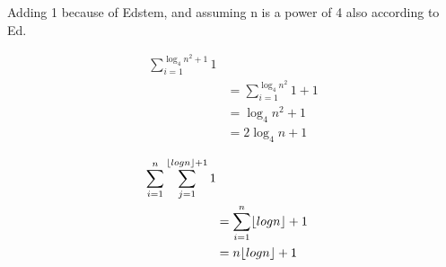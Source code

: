 \documentclass[11pt,largemargins]{homework}
\begin{document}
\begin{alphaparts}
  \newpage
  \questionpart

  Adding 1 because of Edstem, and assuming n is a power of 4 also according to Ed.


  
  \begin{align}
    \sum_{i=1}^{\log_4 n^2 + 1} 1 \\
    &= \sum_{i=1}^{\log_4 n^2} 1 + 1 \\
    &= \log_4 n^2 + 1 \\
    &= 2 \log_4 n + 1
  \end{align}

  \questionpart

  \begin{align}
    \sum_{i=1}^{n} \sum_{j=1}^{\floor*{log n} + 1} 1 \\
    &= \sum_{i=1}^{n} \floor*{log n} + 1 \\
    &= n \floor*{log n} + 1
  \end{align}

\end{alphaparts}
\end{document}
